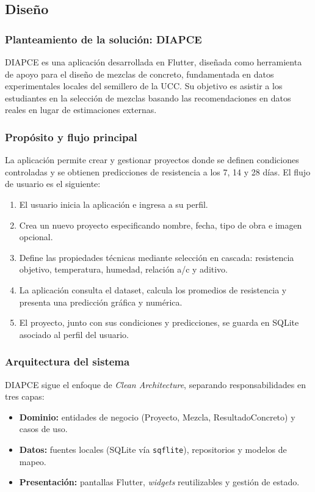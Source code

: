\documentclass[12pt, letterpaper]{article}
\begin{document}
\subsection{Diseño}

\subsubsection*{Planteamiento de la solución: DIAPCE}

DIAPCE es una aplicación desarrollada en Flutter, diseñada como herramienta de apoyo para el diseño de mezclas de concreto, fundamentada en datos experimentales locales del semillero de la UCC. Su objetivo es asistir a los estudiantes en la selección de mezclas basando las recomendaciones en datos reales en lugar de estimaciones externas.

\subsubsection*{Propósito y flujo principal}

La aplicación permite crear y gestionar proyectos donde se definen condiciones controladas y se obtienen predicciones de resistencia a los 7, 14 y 28 días. El flujo de usuario es el siguiente:

\begin{enumerate}
    \item El usuario inicia la aplicación e ingresa a su perfil.
    \item Crea un nuevo proyecto especificando nombre, fecha, tipo de obra e imagen opcional.
    \item Define las propiedades técnicas mediante selección en cascada: resistencia objetivo, temperatura, humedad, relación a/c y aditivo.
    \item La aplicación consulta el dataset, calcula los promedios de resistencia y presenta una predicción gráfica y numérica.
    \item El proyecto, junto con sus condiciones y predicciones, se guarda en SQLite asociado al perfil del usuario.
\end{enumerate}

\subsubsection*{Arquitectura del sistema}

DIAPCE sigue el enfoque de \textit{Clean Architecture}, separando responsabilidades en tres capas:
\begin{itemize}
    \item \textbf{Dominio:} entidades de negocio (Proyecto, Mezcla, ResultadoConcreto) y casos de uso.
    \item \textbf{Datos:} fuentes locales (SQLite vía \texttt{sqflite}), repositorios y modelos de mapeo.
    \item \textbf{Presentación:} pantallas Flutter, \textit{widgets} reutilizables y gestión de estado.
\end{itemize}
\end{document}
